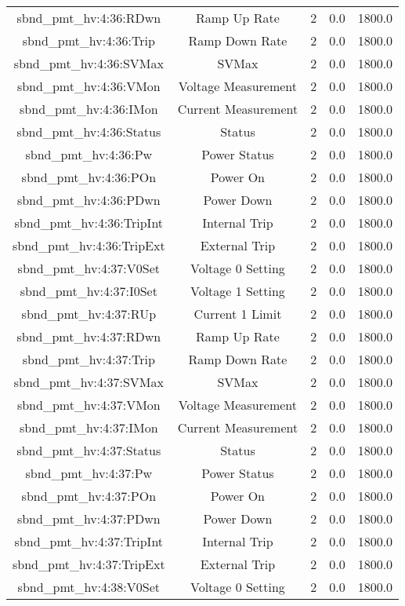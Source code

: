 \begin{table}[ptb]
\begin{tabular}{c | c c c c}
sbnd_pmt_hv:4:36:RDwn & Ramp Up Rate & 2 & 0.0 & 1800.0\\ 
sbnd_pmt_hv:4:36:Trip & Ramp Down Rate & 2 & 0.0 & 1800.0\\ 
sbnd_pmt_hv:4:36:SVMax & SVMax & 2 & 0.0 & 1800.0\\ 
sbnd_pmt_hv:4:36:VMon & Voltage Measurement & 2 & 0.0 & 1800.0\\ 
sbnd_pmt_hv:4:36:IMon & Current Measurement & 2 & 0.0 & 1800.0\\ 
sbnd_pmt_hv:4:36:Status & Status & 2 & 0.0 & 1800.0\\ 
sbnd_pmt_hv:4:36:Pw & Power Status & 2 & 0.0 & 1800.0\\ 
sbnd_pmt_hv:4:36:POn & Power On & 2 & 0.0 & 1800.0\\ 
sbnd_pmt_hv:4:36:PDwn & Power Down & 2 & 0.0 & 1800.0\\ 
sbnd_pmt_hv:4:36:TripInt & Internal Trip & 2 & 0.0 & 1800.0\\ 
sbnd_pmt_hv:4:36:TripExt & External Trip & 2 & 0.0 & 1800.0\\ 
sbnd_pmt_hv:4:37:V0Set & Voltage 0 Setting & 2 & 0.0 & 1800.0\\ 
sbnd_pmt_hv:4:37:I0Set & Voltage 1 Setting & 2 & 0.0 & 1800.0\\ 
sbnd_pmt_hv:4:37:RUp & Current 1 Limit & 2 & 0.0 & 1800.0\\ 
sbnd_pmt_hv:4:37:RDwn & Ramp Up Rate & 2 & 0.0 & 1800.0\\ 
sbnd_pmt_hv:4:37:Trip & Ramp Down Rate & 2 & 0.0 & 1800.0\\ 
sbnd_pmt_hv:4:37:SVMax & SVMax & 2 & 0.0 & 1800.0\\ 
sbnd_pmt_hv:4:37:VMon & Voltage Measurement & 2 & 0.0 & 1800.0\\ 
sbnd_pmt_hv:4:37:IMon & Current Measurement & 2 & 0.0 & 1800.0\\ 
sbnd_pmt_hv:4:37:Status & Status & 2 & 0.0 & 1800.0\\ 
sbnd_pmt_hv:4:37:Pw & Power Status & 2 & 0.0 & 1800.0\\ 
sbnd_pmt_hv:4:37:POn & Power On & 2 & 0.0 & 1800.0\\ 
sbnd_pmt_hv:4:37:PDwn & Power Down & 2 & 0.0 & 1800.0\\ 
sbnd_pmt_hv:4:37:TripInt & Internal Trip & 2 & 0.0 & 1800.0\\ 
sbnd_pmt_hv:4:37:TripExt & External Trip & 2 & 0.0 & 1800.0\\ 
sbnd_pmt_hv:4:38:V0Set & Voltage 0 Setting & 2 & 0.0 & 1800.0\\ 

\end{tabular}
\end{table}
